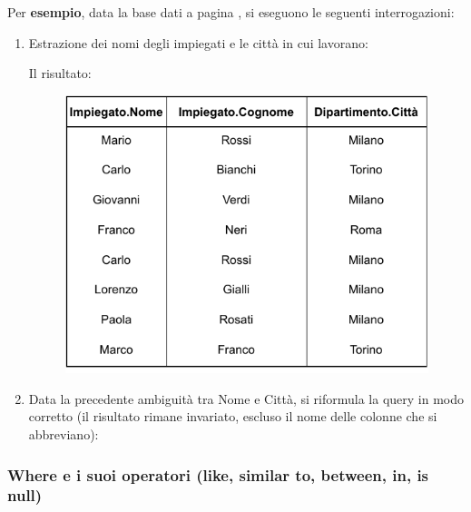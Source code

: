 \documentclass[a4paper]{article}
\begin{document}
	\noindent
	Per \textcolor{Green4}{\textbf{esempio}}, data la base dati a pagina \pageref{img: select dbms}, si eseguono le seguenti interrogazioni:
	\begin{enumerate}
		\item Estrazione dei nomi degli impiegati e le città in cui lavorano:
		
		Il risultato:
		\begin{figure}[!htp]
			\centering
			\includegraphics[width=.7\textwidth]{img/from-ex1.pdf}
		\end{figure}
		
		\item Data la precedente ambiguità tra \textsf{Nome} e \textsf{Città}, si riformula la query in modo corretto (il risultato rimane invariato, escluso il nome delle colonne che si abbreviano):
		
	\end{enumerate}\newpage

	\subsubsection{\textsf{Where} e i suoi operatori (\textsf{like}, \textsf{similar to}, \textsf{between}, \textsf{in}, \textsf{is null})}
	
\end{document}
